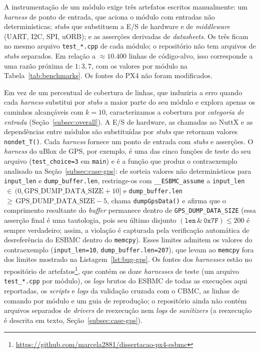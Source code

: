 \documentclass[conference]{IEEEtran}
\begin{document}
A instrumentação de um módulo exige três artefatos escritos
manualmente: um \textit{harness} de ponto de entrada, que aciona o
módulo com entradas não determinísticas; \textit{stubs} que
substituem a E/S de hardware e de \textit{middleware} (UART, I2C,
SPI, uORB); e as asserções derivadas de \textit{datasheets}. Os três
ficam no mesmo arquivo \texttt{test\_*.cpp} de cada módulo; o
repositório não tem arquivos de \textit{stubs} separados. Em relação
a ${\approx}10.400$ linhas de código-alvo, isso corresponde a uma
razão próxima de $1{:}3{,}7$, com os valores por módulo na
Tabela~\ref{tab:benchmarks}. Os fontes do PX4 não foram modificados.

Em vez de um percentual de cobertura de linhas, que induziria a erro
quando cada \textit{harness} substitui por \textit{stubs} a maior
parte do seu módulo e explora apenas os caminhos alcançáveis com
$k=10$, caracterizamos a cobertura por \emph{categoria de entrada}
(Seção~\ref{subsec:overall}). A E/S de hardware, as chamadas ao NuttX
e as dependências entre módulos são substituídas por \textit{stubs}
que retornam valores \texttt{nondet\_T()}.
Cada \textit{harness} fornece um ponto de entrada com \textit{stubs}
e asserções.
O \textit{harness} do uBlox de GPS, por exemplo, é uma das cinco
funções de teste do seu arquivo (\texttt{test\_choice=3} em
\texttt{main}) e é a função que produz o contraexemplo analisado na
Seção~\ref{subsec:case-gps}: ele sorteia valores não determinísticos
para \texttt{input\_len} e \texttt{dump\_buffer.len}, restringe-os
com \texttt{\_\_ESBMC\_assume} a
\texttt{input\_len}$\,\in\,(0,\text{GPS\_DUMP\_DATA\_SIZE}{+}10]$ e
\texttt{dump\_buffer.len}$\,\geq\,\text{GPS\_DUMP\_DATA\_SIZE}{-}5$,
chama \texttt{dumpGpsData()} e afirma que o comprimento resultante do
\textit{buffer} permanece dentro de \texttt{GPS\_DUMP\_DATA\_SIZE}
(essa asserção final é uma tautologia, pois seu último disjunto
$(\texttt{len}\,\&\,\texttt{0x7F})\le 200$ é sempre verdadeiro;
assim, a violação é capturada pela verificação automática de
desreferência do ESBMC dentro do \texttt{memcpy}). Esses limites
admitem os valores do contraexemplo (\texttt{input\_len=10},
\texttt{dump\_buffer.len=207}), que levam ao \texttt{memcpy} fora dos
limites mostrado na Listagem~\ref{lst:bug-gps}.
Os fontes dos \textit{harnesses} estão no repositório de
artefatos\footnote{\url{https://github.com/marcela2881/dissertacao-px4-esbmc}},
que contém os doze \textit{harnesses} de teste (um arquivo
\texttt{test\_*.cpp} por módulo), os \textit{logs} brutos do ESBMC de
todas as execuções aqui reportadas, os \textit{scripts} e
\textit{logs} da validação cruzada com o CBMC, as linhas de comando
por módulo e um guia de reprodução; o repositório ainda não contém
arquivos separados de \textit{drivers} de reexecução nem
\textit{logs} de \textit{sanitizers} (a reexecução é descrita em
texto, Seção~\ref{subsec:case-gps}).
\end{document}
